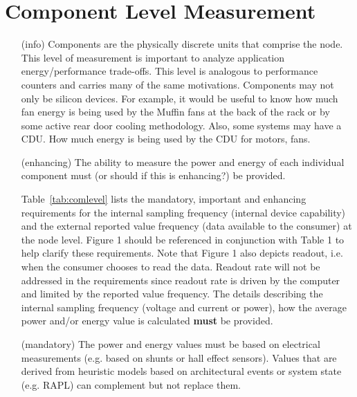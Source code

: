 \section{Component Level Measurement}
\begin{itemize}

\item[(info)]
Components are the physically discrete units that comprise the node. This level of measurement is important to analyze application energy/performance trade-offs. This level is analogous to performance counters and carries many of the same motivations.  Components may not only be silicon devices.  For example, it would be useful to know how much fan energy is being used by the Muffin fans at the back of the rack or by some active rear door cooling methodology.  Also, some systems may have a CDU.  How much energy is being used by the CDU for motors, fans.
	
\item[(enhancing)]
The ability to measure the power and energy of each individual component must (or should if this is enhancing?) be provided.
	
	Table~\ref{tab:comlevel}  lists the mandatory, important and enhancing requirements for the internal sampling frequency (internal device capability) and the external reported value frequency (data available to the consumer) at the node level. Figure 1 should be referenced in conjunction with Table 1 to help clarify these requirements. Note that Figure 1 also depicts readout, i.e. when the consumer chooses to read the data. Readout rate will not be addressed in the requirements since readout rate is driven by the computer and limited by the reported value frequency. The details describing the internal sampling frequency (voltage and current or power), how the average power and/or energy value is calculated \textbf{must} be provided.

\item[(mandatory)]
The power and energy values must be based on electrical measurements (e.g. based on shunts or hall effect sensors). Values that are derived from heuristic models based on architectural events or system state (e.g. RAPL) can complement but not replace them.
\end{itemize}

